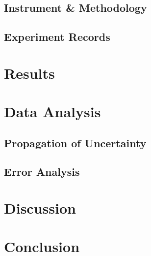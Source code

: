 \documentclass[a4paper,12pt, oneside]{article}
\begin{document}
\begin{CJK}{UTF8}{bkai}
\subsection{Instrument \& Methodology}
\subsection{Experiment Records}
\section{Results}
\section{Data Analysis}
\subsection{Propagation of Uncertainty}
\subsection{Error Analysis}
\section{Discussion}
\section{Conclusion}
\newpage




\end{CJK}
\end{document}
